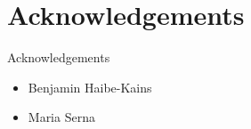 
\section*{Acknowledgements}
\begin{frame}{Acknowledgements}
  \begin{itemize}
    \item Benjamin Haibe-Kains
    \item Maria Serna
  \end{itemize}
\end{frame}